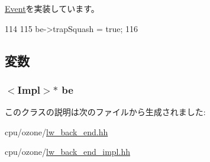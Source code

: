 \hyperlink{classEvent_a142b75b68a6291400e20fb0dd905b1c8}{Event}を実装しています。


\begin{DoxyCode}
114 {
115     be->trapSquash = true;
116 }
\end{DoxyCode}


\subsection{変数}
\hypertarget{classLWBackEnd_1_1TrapEvent_aed04a4a61301f7e61684f9c765c28f15}{
\subsubsection[{be}]{$<$Impl$>$$\ast$ {\bf be}}}
\label{classLWBackEnd_1_1TrapEvent_aed04a4a61301f7e61684f9c765c28f15}


このクラスの説明は次のファイルから生成されました:\begin{DoxyCompactItemize}
\item 
cpu/ozone/\hyperlink{lw__back__end_8hh}{lw\_\-back\_\-end.hh}\item 
cpu/ozone/\hyperlink{lw__back__end__impl_8hh}{lw\_\-back\_\-end\_\-impl.hh}\end{DoxyCompactItemize}
